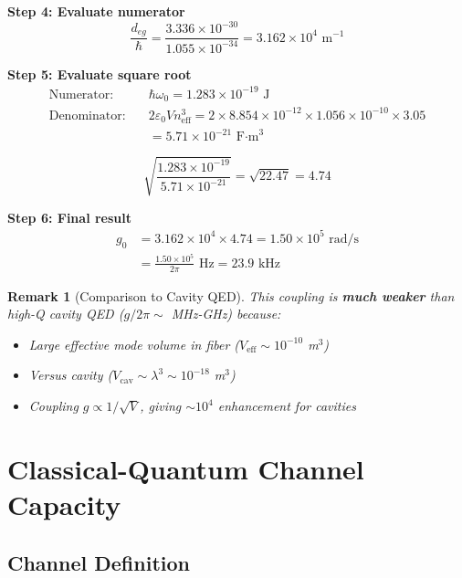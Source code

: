 \documentclass[12pt,a4paper]{article}
\newtheorem{remark}{Remark}
\begin{document}
\textbf{Step 4: Evaluate numerator}
\begin{equation}
\frac{d_{eg}}{\hbar} = \frac{3.336 \times 10^{-30}}{1.055 \times 10^{-34}} = 3.162 \times 10^{4} \text{ m}^{-1}
\end{equation}

\textbf{Step 5: Evaluate square root}
\begin{align}
\text{Numerator:} \quad &\hbar\omega_0 = 1.283 \times 10^{-19} \text{ J}\\
\text{Denominator:} \quad &2\varepsilon_0 V n_{\text{eff}}^3 = 2 \times 8.854 \times 10^{-12} \times 1.056 \times 10^{-10} \times 3.05\\
&= 5.71 \times 10^{-21} \text{ F·m}^3
\end{align}

\begin{equation}
\sqrt{\frac{1.283 \times 10^{-19}}{5.71 \times 10^{-21}}} = \sqrt{22.47} = 4.74
\end{equation}

\textbf{Step 6: Final result}
\begin{align}
g_0 &= 3.162 \times 10^4 \times 4.74 = 1.50 \times 10^5 \text{ rad/s}\\
&= \frac{1.50 \times 10^5}{2\pi} \text{ Hz} = \boxed{23.9 \text{ kHz}}
\end{align}

\begin{remark}[Comparison to Cavity QED]
This coupling is \textbf{much weaker} than high-Q cavity QED ($g/2\pi \sim$ MHz-GHz) because:
\begin{itemize}
\item Large effective mode volume in fiber ($V_{\text{eff}} \sim 10^{-10}$ m$^3$)
\item Versus cavity ($V_{\text{cav}} \sim \lambda^3 \sim 10^{-18}$ m$^3$)
\item Coupling $g \propto 1/\sqrt{V}$, giving $\sim 10^4$ enhancement for cavities
\end{itemize}
\end{remark}

\section{Classical-Quantum Channel Capacity}

\subsection{Channel Definition}
\end{document}
